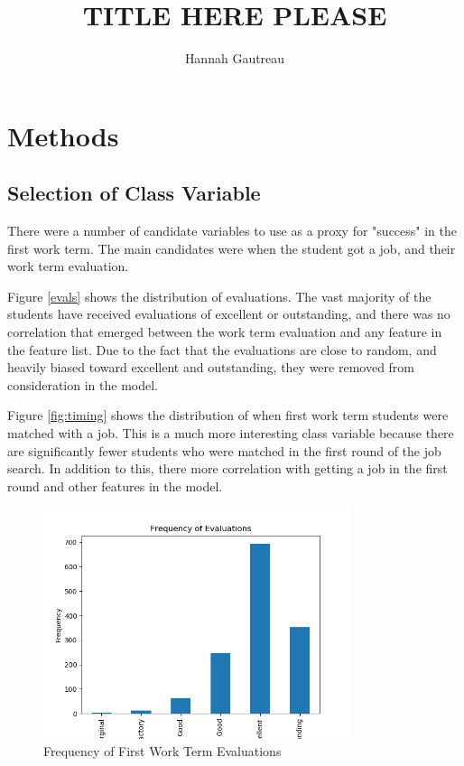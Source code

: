 \documentclass{article}
\begin{document}
\title{TITLE HERE PLEASE} 
\author{Hannah Gautreau}
\date{}
\maketitle

\section{Methods}
\subsection{Selection of Class Variable}
There were a number of candidate variables to use as a proxy for "success" in the first work term. The main candidates were when the student got a job, and their work term evaluation. 

Figure \ref{evals} shows the distribution of evaluations. The vast majority of the students have received evaluations of excellent or outstanding, and there was no correlation that emerged between the work term evaluation and any feature in the feature list. Due to the fact that the evaluations are close to random, and heavily biased toward excellent and outstanding, they were removed from consideration in the model.

Figure \ref{fig:timing} shows the distribution of when first work term students were matched with a job. This is a much more interesting class variable because there are significantly fewer students who were matched in the first round of the job search. In addition to this, there more correlation with getting a job in the first round and other features in the model. 

\begin{figure}[h]
\includegraphics[width=9cm]{images/Evals.png}
\caption{Frequency of First Work Term Evaluations}\label{fig:evals}
\centering
\end{figure}
\end{document}
